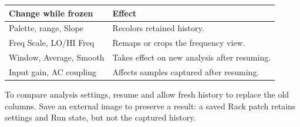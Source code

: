 \begin{center}
\renewcommand{\arraystretch}{1.2}
\begin{tabularx}{\textwidth}{@{}p{}X@{}}
\toprule
\textbf{Change while frozen} & \textbf{Effect} \\
\midrule
Palette, range, Slope & Recolors retained history. \\
Freq Scale, LO/HI Freq & Remaps or crops the frequency view. \\
Window, Average, Smooth & Takes effect on new analysis after resuming. \\
Input gain, AC coupling & Affects samples captured after resuming. \\
\bottomrule
\end{tabularx}
\end{center}

To compare analysis settings, resume and allow fresh history to replace the
old columns. Save an external image to preserve a result: a saved Rack patch
retains settings and Run state, but not the captured history.
